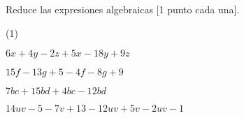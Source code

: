 \documentclass[sin curso]{plantilla-guia-v1}
\begin{document}
\begin{enumerar}
\begin{tikzpicture}[line width=1pt]
    \end{tikzpicture}    

    \begin{respuesta}[height=3cm]
    \end{respuesta}

  \item Reduce las expresiones algebraicas [1 punto cada una].
  \begin{ejercicios}(1)
    \item $6x +4y -2z +5x -18y +9z$
    \begin{malla}[height=3cm]
    \end{malla}
    \item $15f -13g +5 -4f -8g +9$
    \begin{malla}[height=3cm]
    \end{malla}
    \item $7bc +15bd +4bc -12bd$
    \begin{malla}[height=3cm]
    \end{malla}
    \item $14uv -5 -7v +13 -12uv + 5v -2uv -1$
    \begin{malla}[height=3cm]
    \end{malla}
  \end{ejercicios}
  
\end{enumerar}
\end{document}
